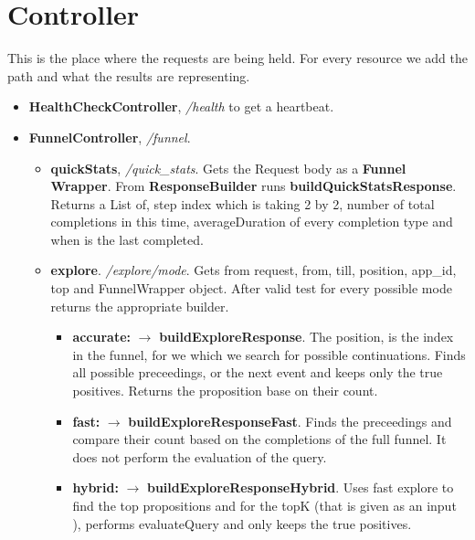 \documentclass{article}
\begin{document}
\section{Controller}
This is the place where the requests are being held. For every resource we add the path and what the results are representing.
\begin{itemize}	
	\item \textbf{HealthCheckController}, \textit{/health} to get a heartbeat.
	\item \textbf{FunnelController}, \textit{/funnel}.
	\begin{itemize}
		\item \textbf{quickStats}, \textit{/quick\_stats}. Gets the Request body as a \textbf{Funnel Wrapper}. From \textbf{ResponseBuilder} runs \textbf{buildQuickStatsResponse}. Returns a List of, step index which is taking 2 by 2, number of total completions in this time, averageDuration of every completion type and when is the last completed. %
		\item \textbf{explore}. \textit{/explore/mode}. Gets from request, from, till, position, app\_id, top and FunnelWrapper object. After valid test for every possible mode returns the appropriate builder.\\
		\begin{itemize}
			\item \textbf{accurate:} $\rightarrow$ \textbf{buildExploreResponse}. The position, is the index in the funnel, for we which we search for possible continuations. Finds all possible preceedings, or the next event and keeps only the true positives. Returns the proposition base on their count.
			\item \textbf{fast:} $\rightarrow$ \textbf{buildExploreResponseFast}. Finds the preceedings and compare their count based on the completions of the full funnel. It does not perform the evaluation of the query.
			\item \textbf{hybrid:} $\rightarrow$ \textbf{buildExploreResponseHybrid}. Uses fast explore to find the top propositions and for the topK (that is given as an input ), performs evaluateQuery and only keeps the true positives.
		\end{itemize}
	\end{itemize}
\end{itemize}
\end{document}
